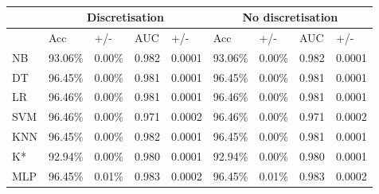 \begin{table}[htbp]
\caption{}
\begin{tabular}{|l|r|r|r|r|r|r|r|r|}
\hline
 & \multicolumn{ 4}{c|}{Discretisation} & \multicolumn{ 4}{c|}{No discretisation} \\ \hline
 & \multicolumn{1}{l|}{Acc} & \multicolumn{1}{l|}{+/-} & \multicolumn{1}{l|}{AUC} & \multicolumn{1}{l|}{+/-} & \multicolumn{1}{l|}{Acc} & \multicolumn{1}{l|}{+/-} & \multicolumn{1}{l|}{AUC} & \multicolumn{1}{l|}{+/-} \\ \hline
NB & 93.06\% & 0.00\% & 0.982 & 0.0001 & 93.06\% & 0.00\% & 0.982 & 0.0001 \\ \hline
DT & 96.45\% & 0.00\% & 0.981 & 0.0001 & 96.45\% & 0.00\% & 0.981 & 0.0001 \\ \hline
LR & 96.46\% & 0.00\% & 0.981 & 0.0001 & 96.46\% & 0.00\% & 0.981 & 0.0001 \\ \hline
SVM & 96.46\% & 0.00\% & 0.971 & 0.0002 & 96.46\% & 0.00\% & 0.971 & 0.0002 \\ \hline
KNN & 96.45\% & 0.00\% & 0.982 & 0.0001 & 96.45\% & 0.00\% & 0.981 & 0.0001 \\ \hline
K* & 92.94\% & 0.00\% & 0.980 & 0.0001 & 92.94\% & 0.00\% & 0.980 & 0.0001 \\ \hline
MLP & 96.45\% & 0.01\% & 0.983 & 0.0002 & 96.45\% & 0.01\% & 0.983 & 0.0002 \\ \hline
\end{tabular}
\label{}
\end{table}
